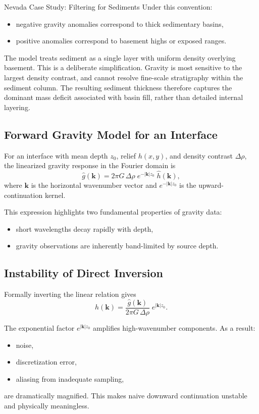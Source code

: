 \begin{activity}{Nevada Case Study: Filtering for Sediments}
Under this convention:
\begin{itemize}
  \item negative gravity anomalies correspond to thick sedimentary basins,
  \item positive anomalies correspond to basement highs or exposed ranges.
\end{itemize}

The model treats sediment as a single layer with uniform density overlying basement.
This is a deliberate simplification.
Gravity is most sensitive to the largest density contrast,
and cannot resolve fine-scale stratigraphy within the sediment column.
The resulting sediment thickness therefore captures the dominant mass deficit
associated with basin fill, rather than detailed internal layering.

\subsection*{Forward Gravity Model for an Interface}

For an interface with mean depth $z_0$, relief $h(x,y)$, and density contrast
$\Delta\rho$, the linearized gravity response in the Fourier domain is
\begin{equation}
\hat{g}(\mathbf{k})
=
2\pi G\,\Delta\rho \;
e^{-|\mathbf{k}| z_0}
\;
\hat{h}(\mathbf{k}),
\end{equation}
where $\mathbf{k}$ is the horizontal wavenumber vector and
$e^{-|\mathbf{k}| z_0}$ is the upward-continuation kernel.

This expression highlights two fundamental properties of gravity data:
\begin{itemize}
  \item short wavelengths decay rapidly with depth,
  \item gravity observations are inherently band-limited by source depth.
\end{itemize}

\subsection*{Instability of Direct Inversion}

Formally inverting the linear relation gives
\begin{equation}
\hat{h}(\mathbf{k})
=
\frac{\hat{g}(\mathbf{k})}
{2\pi G\,\Delta\rho}
\;
e^{|\mathbf{k}| z_0}.
\end{equation}

The exponential factor $e^{|\mathbf{k}| z_0}$ amplifies high-wavenumber components.
As a result:
\begin{itemize}
  \item noise,
  \item discretization error,
  \item aliasing from inadequate sampling,
\end{itemize}
are dramatically magnified.
This makes naive downward continuation unstable and physically meaningless.


\end{activity}

